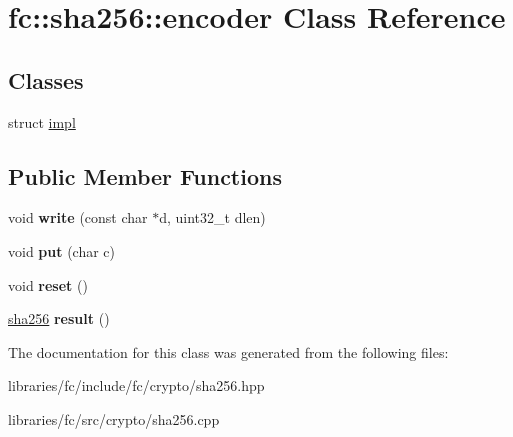 \hypertarget{classfc_1_1sha256_1_1encoder}{}\section{fc\+:\+:sha256\+:\+:encoder Class Reference}
\label{classfc_1_1sha256_1_1encoder}
\subsection*{Classes}
\begin{DoxyCompactItemize}
\item 
struct \mbox{\hyperlink{structfc_1_1sha256_1_1encoder_1_1impl}{impl}}
\end{DoxyCompactItemize}
\subsection*{Public Member Functions}
\begin{DoxyCompactItemize}
\item 
\mbox{\label{classfc_1_1sha256_1_1encoder_a4a246dfb33e3eb78ba167446bee92e30}} 
void {\bfseries write} (const char $\ast$d, uint32\+\_\+t dlen)
\item 
\mbox{\label{classfc_1_1sha256_1_1encoder_a9650e725131f96e270985056adcd5478}} 
void {\bfseries put} (char c)
\item 
\mbox{\label{classfc_1_1sha256_1_1encoder_ab9082a37acbbd89c1ce776d5a2e17276}} 
void {\bfseries reset} ()
\item 
\mbox{\label{classfc_1_1sha256_1_1encoder_a4d8b8181e912194cf98a56164671adf8}} 
\mbox{\hyperlink{classfc_1_1sha256}{sha256}} {\bfseries result} ()
\end{DoxyCompactItemize}


The documentation for this class was generated from the following files\+:\begin{DoxyCompactItemize}
\item 
libraries/fc/include/fc/crypto/sha256.\+hpp\item 
libraries/fc/src/crypto/sha256.\+cpp\end{DoxyCompactItemize}
